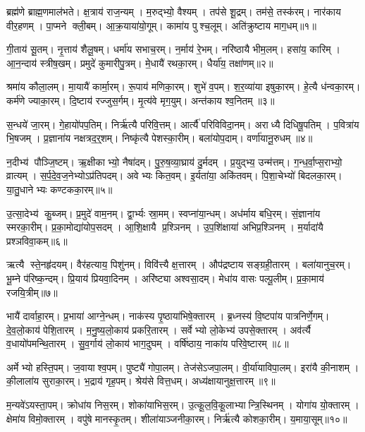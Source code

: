 ब्रह्म॑णे ब्राह्म॒णमाल॑भते।
क्ष॒त्राय॑ राज॒न्यम्।
म॒रुद्भ्यो॒ वैश्यम्।
तप॑से शू॒द्रम्।
तम॑से॒ तस्क॑रम्।
नार॑काय वीर॒हणम्।
पा॒प्मने क्ली॒बम्।
आ॒क्र॒याया॑यो॒गूम्।
कामा॑य पुश्च॒लूम्।
अति॑क्रुष्टाय माग॒धम्॥१॥

गी॒ताय॑ सू॒तम्।
नृ॒त्ताय॑ शैलू॒षम्।
धर्मा॑य सभाच॒रम्।
न॒र्माय॑ रे॒भम्।
नरि॑ष्ठायै भीम॒लम्।
हसा॑य॒ कारिम्।
आ॒न॒न्दाय॑ स्त्रीष॒खम्।
प्रमुदे॑ कुमारीपु॒त्रम्।
मे॒धायै॑ रथका॒रम्।
धैर्या॑य॒ तक्षा॑णम्॥२॥

श्रमा॑य कौला॒लम्।
मा॒यायै॑ कार्मा॒रम्।
रू॒पाय॑ मणिका॒रम्।
शुभे॑ व॒पम्।
श॒र॒व्या॑या इषुका॒रम्।
हे॒त्यै ध॑न्वका॒रम्।
कर्म॑णे ज्याका॒रम्।
दि॒ष्टाय॑ रज्जुस॒र्गम्।
मृ॒त्य॑वे मृग॒युम्।
अन्त॑काय श्व॒नितम्॥३॥

स॒न्धये॑ जा॒रम्।
गे॒हायो॑पप॒तिम्।
निर्\mbox{}ऋ॑त्यै परिवि॒त्तम्।
आर्त्यै॑ परिविविदा॒नम्।
अराध्यै दिधिषू॒पतिम्।
प॒वित्रा॑य भि॒षजम्।
प्र॒ज्ञाना॑य नक्षत्रद॒र्॒शम्।
निष्कृ॑त्यै पेशस्का॒रीम्।
बला॑योप॒दाम्।
वर्णा॑यानू॒रुधम्॥४॥

न॒दीभ्य॑ पौञ्जि॒ष्टम्।
ऋ॒क्षीकाभ्यो॒ नैषा॑दम्।
पु॒रु॒ष॒व्या॒घ्राय॑ दु॒र्मदम्।
प्र॒युद्भ्य॒ उन्म॑त्तम्।
ग॒न्ध॒र्वा॒प्स॒राभ्यो॒ व्रात्यम्।
स॒र्प॒दे॒व॒ज॒नेभ्योऽप्र॑तिपदम्।
अवेभ्यः कित॒वम्।
इ॒र्यता॑या॒ अकि॑तवम्।
पि॒शा॒चेभ्यो॑ बिदलका॒रम्।
या॒तु॒धानेभ्यः कण्टकका॒रम्॥५॥

उ॒त्सा॒देभ्य॑ कु॒ब्जम्।
प्र॒मुदे॑ वाम॒नम्।
द्वा॒र्भ्यः स्रा॒मम्।
स्वप्ना॑या॒न्धम्।
अध॑र्माय बधि॒रम्।
सं॒ज्ञाना॑य स्मरका॒रीम्।
प्र॒का॒मोद्या॑योप॒सदम्।
आ॒शि॒क्षायै प्र॒श्ञिनम्।
उ॒प॒शि॑क्षाया॑ अभिप्र॒श्ञिनम्।
म॒र्यादा॑यै प्रश्ञविवा॒कम्॥६॥

ऋत्यै स्ते॒नहृ॑दयम्।
वैर॑हत्याय॒ पिशु॑नम्।
विवि॑त्त्यै क्ष॒त्तारम्।
औप॑द्रष्टाय सङ्ग्रही॒तारम्।
बला॑यानुच॒रम्।
भू॒म्ने प॑रिष्क॒न्दम्।
प्रि॒याय॑ प्रियवा॒दिनम्।
अरि॑ष्ट्या अश्वसा॒दम्।
मेधा॑य वासः पल्पू॒लीम्।
प्र॒का॒माय॑ रजयि॒त्रीम्॥७॥

भायै॑ दार्वाहा॒रम्।
प्र॒भाया॑ आग्ने॒न्धम्।
नाक॑स्य पृ॒ष्ठाया॑भिषे॒क्तारम्।
ब्र॒ध्नस्य॑ वि॒ष्टपा॑य पात्रनिर्णे॒गम्।
दे॒व॒लो॒काय॑ पेशि॒तारम्।
म॒नु॒ष्य॒लो॒काय॑ प्रकरि॒तारम्।
सर्वेभ्यो लो॒केभ्य॑ उपसे॒क्तारम्।
अव॑र्त्यै व॒धायो॑पमन्थि॒तारम्।
सु॒व॒र्गाय॑ लो॒काय॑ भाग॒दुघम्।
वर्\mbox{}षि॑ष्ठाय॒ नाका॑य परिवे॒ष्टारम्॥८॥

अर्मेभ्यो हस्ति॒पम्।
ज॒वायाश्व॒पम्।
पुष्ट्यै॑ गोपा॒लम्।
तेज॑सेऽजपा॒लम्।
वी॒र्या॑याविपा॒लम्।
इरा॑यै की॒नाशम्।
की॒लाला॑य सुराका॒रम्।
भ॒द्राय॑ गृह॒पम्।
श्रेय॑से वित्त॒धम्।
अध्य॑क्षायानुक्ष॒त्तारम्॥९॥

म॒न्यवे॑ऽयस्ता॒पम्।
क्रोधा॑य निस॒रम्।
शोका॑याभिस॒रम्।
उ॒त्कू॒ल॒वि॒कू॒लाभ्यान्त्रि॒स्थिनम्।
योगा॑य यो॒क्तारम्।
क्षेमा॑य विमो॒क्तारम्।
वपु॑षे मानस्कृ॒तम्।
शीला॑याञ्जनीका॒रम्।
निर्\mbox{}ऋ॑त्यै कोशका॒रीम्।
य॒माया॒सूम्॥१०॥

